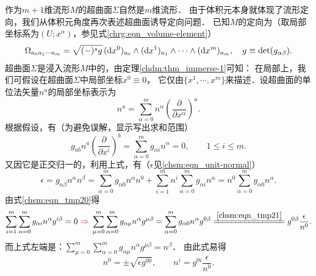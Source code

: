 作为$m+1$维流形$M$的超曲面$\Sigma$自然是$m$维流形．
由于体积元本身就体现了流形定向，我们从体积元角度再次表述超曲面诱导定向问题．
已知$M$的定向为（取局部坐标系为$(U;x^\alpha)$，参见式\eqref{chrg:eqn_volume-element}）
\begin{equation}\label{chsm:eqn_VEM}
    \Omega_{a_0 a_1 \cdots a_m}= \sqrt{(-)^s g}\, ({\rm d}x^0)_{a_0} \wedge({\rm d}x^1)_{a_1} \wedge
    \cdots \wedge({\rm d}x^m)_{a_m},   \quad g\equiv \det(g_{\alpha\beta}).
\end{equation}
超曲面$\Sigma$是浸入流形$M$中的，由定理\ref{chdm:thm_immerse-1}可知：
在局部上，我们可假设在超曲面$\Sigma$中局部坐标$x^0\equiv 0$，
它仅由$\{x^1,\cdots,x^m\}$来描述．设超曲面的单位法矢量$n^a$的局部坐标表示为
\begin{equation}
    n^a = \sum_{\alpha=0}^{m} n^\alpha \left(\frac{\partial }{\partial x^\alpha}\right)^a.
\end{equation}
根据假设，有（为避免误解，显示写出求和范围）
\begin{equation}\label{chsm:eqn_tmp20}
    g_{ab}n^a \left(\frac{\partial }{\partial x^i}\right)^b =
      \sum_{\alpha=0}^{m} g_{\alpha i}  n^\alpha =0, \qquad 1 \leqslant i \leqslant m.
\end{equation}
又因它是正交归一的，利用上式，有（$\epsilon$见\eqref{chsm:eqn_unit-normal}）
\begin{equation}\label{chsm:eqn_tmp21}
    \epsilon  = g_{\alpha\beta} n^\alpha n^\beta  %
     = \sum_{\alpha=0}^{m}g_{\alpha 0}n^\alpha n^0 + \sum_{i=1}^{m}  n^i \sum_{\alpha=0}^{m}g_{\alpha i}n^\alpha
     = n^0 \sum_{\alpha=0}^{m}g_{\alpha 0}n^\alpha  .
\end{equation}
由式\eqref{chsm:eqn_tmp20}得
\begin{equation*}
    \sum_{i=1}^{m}\sum_{\alpha=0}^{m} g_{\alpha i}  n^\alpha g^{i\beta} =0 {\ \color{red}\Rightarrow\ }
    \sum_{\mu=0}^{m}\sum_{\alpha=0}^{m} g_{\alpha \mu}  n^\alpha g^{\mu\beta}
    =\sum_{\alpha=0}^{m} g_{\alpha 0}  n^\alpha g^{0\beta}
    \xlongequal{\ref{chsm:eqn_tmp21}}
    g^{0\beta} \frac{\epsilon}{n^0} .
\end{equation*}
而上式左端是：$\sum_{\mu=0}^{m}\sum_{\alpha=0}^{m} g_{\alpha \mu}  n^\alpha g^{\mu\beta} =n^\beta$．
由此式易得
\begin{equation}\label{chsm:eqn_n0i=g}
    n^0 = \pm \sqrt{\epsilon g^{00}}, \qquad
    n^i =  g^{0i} \frac{\epsilon}{n^0} .
\end{equation}
